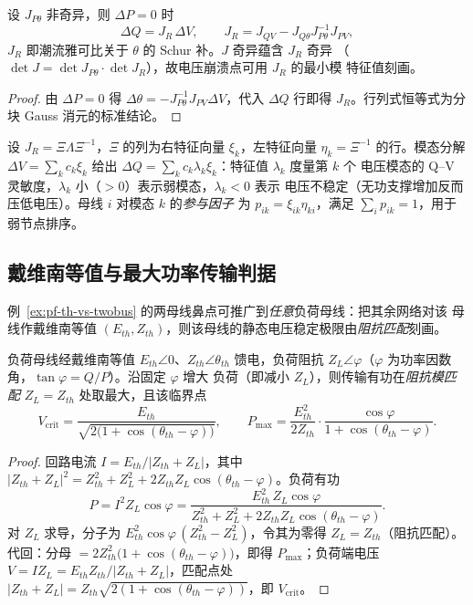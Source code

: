 \begin{proposition}\label{prop:pf-th-vs-modal}
设 $J_{P\theta}$ 非奇异，则 $\Delta P=0$ 时
\begin{equation}
\Delta Q=J_R\,\Delta V,\qquad
J_R=J_{QV}-J_{Q\theta}J_{P\theta}^{-1}J_{PV},
\end{equation}
$J_R$ 即潮流雅可比关于 $\theta$ 的 Schur 补。$J$ 奇异蕴含 $J_R$ 奇异
（$\det J=\det J_{P\theta}\cdot\det J_R$），故电压崩溃点可用 $J_R$ 的最小模
特征值刻画。
\end{proposition}
\begin{proof}
由 $\Delta P=0$ 得 $\Delta\theta=-J_{P\theta}^{-1}J_{PV}\Delta V$，代入
$\Delta Q$ 行即得 $J_R$。行列式恒等式为分块 Gauss 消元的标准结论。
\end{proof}

设 $J_R=\Xi\Lambda\Xi^{-1}$，$\Xi$ 的列为右特征向量 $\xi_k$，左特征向量
$\eta_k=\Xi^{-1}$ 的行。模态分解 $\Delta V=\sum_k c_k\xi_k$ 给出
$\Delta Q=\sum_k c_k\lambda_k\xi_k$：特征值 $\lambda_k$ 度量第 $k$ 个
电压模态的 Q--V 灵敏度，$\lambda_k$ 小（$>0$）表示弱模态，$\lambda_k<0$ 表示
电压不稳定（无功支撑增加反而压低电压）。母线 $i$ 对模态 $k$ 的\emph{参与因子}
为 $p_{ik}=\xi_{ik}\eta_{ki}$，满足 $\sum_i p_{ik}=1$，用于弱节点排序。

\subsection{戴维南等值与最大功率传输判据}\label{sec:pf-th-vs-thevenin}

例~\ref{ex:pf-th-vs-twobus} 的两母线鼻点可推广到\emph{任意}负荷母线：把其余网络对该
母线作戴维南等值 $(E_{th},Z_{th})$，则该母线的静态电压稳定极限由\emph{阻抗匹配}刻画。

\begin{theorem}[最大功率传输与临界电压]\label{thm:pf-th-vs-thevenin}
负荷母线经戴维南等值 $E_{th}\angle0$、$Z_{th}\angle\theta_{th}$ 馈电，负荷阻抗
$Z_L\angle\varphi$（$\varphi$ 为功率因数角，$\tan\varphi=Q/P$）。沿固定 $\varphi$ 增大
负荷（即减小 $Z_L$），则传输有功在\emph{阻抗模匹配} $Z_L=Z_{th}$ 处取最大，且该临界点
\begin{equation}
V_{\mathrm{crit}}=\frac{E_{th}}{\sqrt{2\bigl(1+\cos(\theta_{th}-\varphi)\bigr)}},\qquad
P_{\max}=\frac{E_{th}^2}{2Z_{th}}\cdot\frac{\cos\varphi}{1+\cos(\theta_{th}-\varphi)} .
\label{eq:pf-th-vs-thevenin}
\end{equation}
\end{theorem}
\begin{proof}
回路电流 $I=E_{th}/|Z_{th}+Z_L|$，其中
$|Z_{th}+Z_L|^2=Z_{th}^2+Z_L^2+2Z_{th}Z_L\cos(\theta_{th}-\varphi)$。负荷有功
\begin{equation*}
P=I^2Z_L\cos\varphi
=\frac{E_{th}^2\,Z_L\cos\varphi}{Z_{th}^2+Z_L^2+2Z_{th}Z_L\cos(\theta_{th}-\varphi)} .
\end{equation*}
对 $Z_L$ 求导，分子为 $E_{th}^2\cos\varphi\,(Z_{th}^2-Z_L^2)$，令其为零得
$Z_L=Z_{th}$（阻抗匹配）。代回：分母
$=2Z_{th}^2\bigl(1+\cos(\theta_{th}-\varphi)\bigr)$，即得 $P_{\max}$；负荷端电压
$V=IZ_L=E_{th}Z_{th}/|Z_{th}+Z_L|$，匹配点处
$|Z_{th}+Z_L|=Z_{th}\sqrt{2(1+\cos(\theta_{th}-\varphi))}$，即 $V_{\mathrm{crit}}$。
\end{proof}

